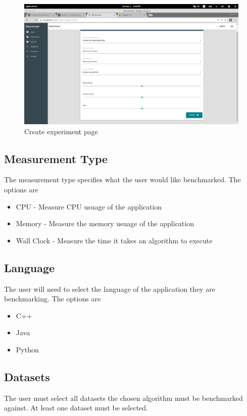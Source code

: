 \documentclass[11pt,a4paper]{article}
\begin{document}
\begin{figure}[H]
	\begin{center}
		\includegraphics[scale=0.3]{../Images/User Manual/Create Experiment.png}
		\caption{Create experiment page}
		\label{fig:createExperiment}
	\end{center}  
\end{figure}

\subsection{Measurement Type}
The measurement type specifies what the user would like benchmarked. The options are
\begin{itemize}
  \item CPU - Measure CPU usuage of the application
  \item Memory - Measure the memory usuage of the application
  \item Wall Clock - Measure the time it takes an algorithm to execute
\end{itemize}

\subsection{Language}
The user will need to select the language of the application they are benchmarking.
The options are
\begin{itemize}
  \item C++
  \item Java
  \item Python
\end{itemize}


\subsection{Datasets}
The user must select all datasets the chosen algorithm must be benchmarked against. At least
one dataset must be selected.
\end{document}
